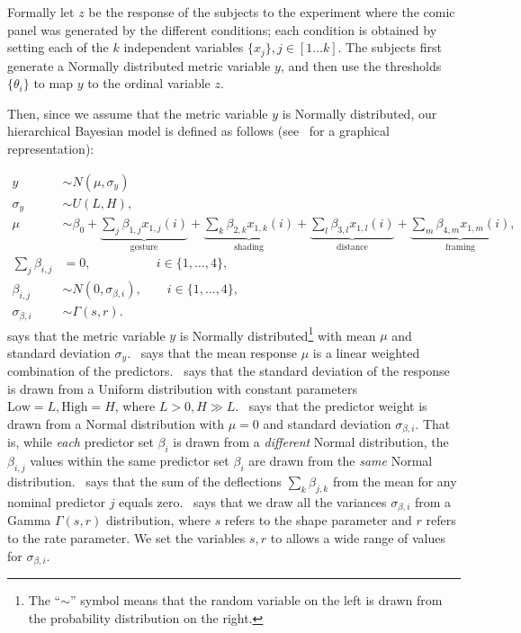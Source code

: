 Formally let $z$ be the response of the subjects to the experiment where the comic panel was generated by the different conditions; each condition is obtained by setting each of the $k$ independent variables $\{x_j\}, j \in [1 \ldots k]$. The subjects first generate a Normally distributed metric variable $y$, and then use the thresholds $\{\theta_i\}$ to map $y$ to the ordinal variable $z$.

Then, since we assume that the metric variable $y$ is Normally distributed, our hierarchical Bayesian model is defined as follows (see~ for a graphical representation):

\begin{align}
 y                  & \sim N(\mu, \sigma_y)                    \label{eq:response-main}                       \\
 \sigma_y           & \sim U(L, H), \label{eq:main-sigma}                                                     \\
 \mu                & \sim \beta_0 +
 \underbrace{\sum_{j} \beta_{1,j} x_{1,j}(i)}_{\text{gesture}} +
 \underbrace{\sum_k \beta_{2,k} x_{1,k}(i)}_{\text{shading}} +
 \underbrace{\sum_l \beta_{3,l} x_{1,l}(i)}_{\text{distance}} +
 \underbrace{\sum_m \beta_{4,m} x_{1,m}(i)}_{\text{framing}} ,                  \label{eq:mu-main} \\
 \sum_j \beta_{i,j} & = 0, \qquad  \qquad  \quad \, i \in \{1, \ldots, 4\}, \label{eq:beta-equality}          \\
 \beta_{i,j}        & \sim N(0, \sigma_{\beta, i}), \qquad  i \in \{1, \ldots, 4\},\label{eq:main-beta-sigma} \\
 \sigma_{\beta, i}  & \sim \Gamma(s, r ). \label{eq:gamma-distribution}
\end{align}
 says that the metric variable $y$ is Normally distributed\footnote{The ``$\sim$'' symbol means that the random variable on the left is drawn from the probability distribution on the right.} with mean $\mu$ and standard deviation $\sigma_y$.~ says that the mean response $\mu$ is a linear weighted combination of the predictors.~ says that the standard deviation of the response is drawn from a Uniform distribution with constant parameters $\text{Low}=L, \text{High}=H$, where $L>0, H\gg L$.~ says that the predictor weight is drawn from a Normal distribution with $\mu=0$ and standard deviation $\sigma_{\beta, i}$. That is,  while \textit{each} predictor set $\beta_{i}$ is drawn from a \textit{different} Normal distribution, the $\beta_{i,j}$ values within the same predictor set $\beta_{i}$ are drawn from the \textit{same} Normal distribution.~ says that the sum of the deflections $\sum_k \beta_{j,k}$ from the mean for any nominal predictor $j$ equals zero.~ says that we draw all the variances $\sigma_{\beta, i}$ from a Gamma $\Gamma(s,r)$ distribution, where $s$ refers to the shape parameter and $r$ refers to the rate parameter. We set the variables $s,r$ to allows a wide range of values for $\sigma_{\beta, i}$.

